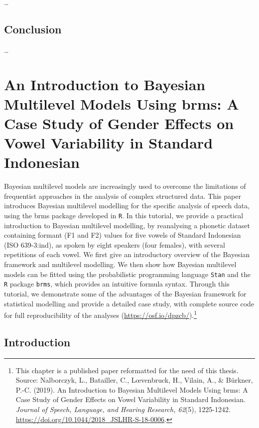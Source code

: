 \documentclass[a4paper,12pt,twoside,openright,oldfontcommands]{memoir}
\let\rmarkdownfootnote\footnote%
\def\footnote{\protect\rmarkdownfootnote}
\begin{document}
\ldots{}

\hypertarget{conclusion}{%
\section{Conclusion}\label{conclusion}}

\ldots{}

\hypertarget{appendix-appendix}{%
\appendix {}}


\hypertarget{appendix-brms}{%
\chapter{An Introduction to Bayesian Multilevel Models Using brms: A Case Study of Gender Effects on Vowel Variability in Standard Indonesian}\label{appendix-brms}}

Bayesian multilevel models are increasingly used to overcome the limitations of frequentist approaches in the analysis of complex structured data. This paper introduces Bayesian multilevel modelling for the specific analysis of speech data, using the brms package developed in \texttt{R}. In this tutorial, we provide a practical introduction to Bayesian multilevel modelling, by reanalysing a phonetic dataset containing formant (F1 and F2) values for five vowels of Standard Indonesian (ISO 639-3:ind), as spoken by eight speakers (four females), with several repetitions of each vowel. We first give an introductory overview of the Bayesian framework and multilevel modelling. We then show how Bayesian multilevel models can be fitted using the probabilistic programming language \texttt{Stan} and the \texttt{R} package \texttt{brms}, which provides an intuitive formula syntax. Through this tutorial, we demonstrate some of the advantages of the Bayesian framework for statistical modelling and provide a detailed case study, with complete source code for full reproducibility of the analyses (\url{https://osf.io/dpzcb/}).\footnote{This chapter is a published paper reformatted for the need of this thesis. Source: Nalborczyk, L., Batailler, C., L\oe venbruck, H., Vilain, A., \& Bürkner, P.-C. (2019). An Introduction to Bayesian Multilevel Models Using brms: A Case Study of Gender Effects on Vowel Variability in Standard Indonesian. \emph{Journal of Speech, Language, and Hearing Research, 62}(5), 1225-1242. \url{https://doi.org/10.1044/2018_JSLHR-S-18-0006}.}

\hypertarget{introduction-5}{%
\section{Introduction}\label{introduction-5}}
\end{document}
